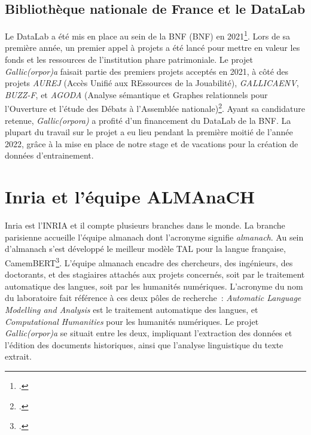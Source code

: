 \documentclass[class=article, crop=false]{standalone}
\begin{document}
\subsection{Bibliothèque nationale de France et le DataLab}
Le DataLab a été mis en place au sein de la \acrlong{BNF} (\acrshort{BNF}) en 2021\footcite{carlinBnFDataLabService2021}. Lors de sa première année, un premier appel à projets a été lancé  pour mettre en valeur les fonds et les ressources de l'institution phare patrimoniale. Le projet \textit{Gallic(orpor)a} faisait partie des premiers projets acceptés en 2021, à côté des projets \textit{AUREJ} (Accès Unifié aux REssources de la Jouabilité), \textit{GALLICAENV}, \textit{BUZZ-F}, et \textit{AGODA} (Analyse sémantique et Graphes relationnels pour l’Ouverture et l’étude des Débats à l’Assemblée nationale)\footcite[123]{bibliothequenationaledefranceRapportActivite20212022}. Ayant sa candidature retenue, \textit{Gallic(orpora)} a profité d'un financement du DataLab de la \acrshort{BNF}. La plupart du travail sur le projet a eu lieu pendant la première moitié de l'année 2022, grâce à la mise en place de notre stage et de vacations pour la création de données d'entrainement.

\section{Inria et l'équipe ALMAnaCH}
\Gls{Inria} est l'\acrlong{INRIA} et il compte plusieurs branches dans le monde. La branche parisienne accueille l'équipe \acrshort{almanach} dont l'acronyme signifie \textit{\acrlong{almanach}}. Au sein d'\acrshort{almanach} s'est développé le meilleur modèle \acrshort{TAL} pour la langue française, CamemBERT\footcite{martinCamemBERTTastyFrench2020}. L'équipe \acrshort{almanach} encadre des chercheurs, des ingénieurs, des doctorants, et des stagiaires attachés aux projets concernés, soit par le traitement automatique des langues, soit par les humanités numériques. L'acronyme du nom du laboratoire fait référence à ces deux pôles de recherche~: \textit{Automatic Language Modelling and Analysis} est le traitement automatique des langues, et  \textit{Computational Humanities} pour les humanités numériques. Le projet \textit{Gallic(orpor)a} se situait entre les deux, impliquant l'extraction des données et l'édition des documents historiques, ainsi que l'analyse linguistique du texte extrait.
\end{document}
